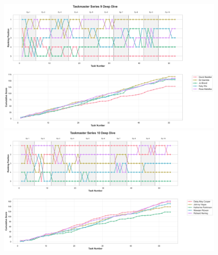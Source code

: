 \documentclass[10pt,letterpaper]{article}
\begin{document}
\begin{figure}[!h]
\centering
\includegraphics[width=\linewidth]{figures/supplementary/series_9_deep_dive.png}
\includegraphics[width=\linewidth]{figures/supplementary/series_10_deep_dive.png}
\end{figure}
\FloatBarrier
\clearpage
\end{document}
